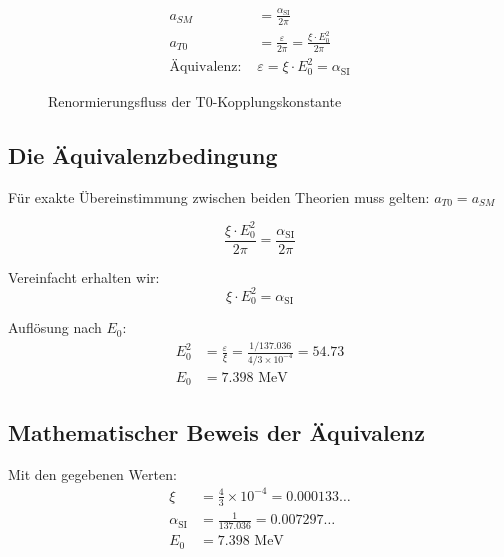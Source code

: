 \documentclass[12pt,a4paper]{article}
\numberwithin{equation}{section}
\newcommand{\xipar}{\xi}
\newcommand{\epsilonT}{\varepsilon}
\newcommand{\alphaSI}{\alpha_{\text{SI}}}
\newcommand{\Eo}{E_0}
\begin{document}
	\begin{align}
		a_{SM} &= \frac{\alphaSI}{2\pi} \\
		a_{T0} &= \frac{\epsilonT}{2\pi} = \frac{\xipar \cdot \Eo^2}{2\pi} \\
		\text{Äquivalenz: } &\epsilonT = \xipar \cdot \Eo^2 = \alphaSI
	\end{align}
	
	\begin{figure}[h]
		\centering
		\caption{Renormierungsfluss der T0-Kopplungskonstante}
		\label{fig:renormalization_flow}
	\end{figure}
	
	\subsection{Die Äquivalenzbedingung}
	
	Für exakte Übereinstimmung zwischen beiden Theorien muss gelten: $a_{T0} = a_{SM}$
	
	\begin{equation}
		\frac{\xipar \cdot \Eo^2}{2\pi} = \frac{\alphaSI}{2\pi}
		\label{eq:equivalence_condition}
	\end{equation}
	
	Vereinfacht erhalten wir:
	\begin{equation}
		\xipar \cdot \Eo^2 = \alphaSI
		\label{eq:simplified_equivalence}
	\end{equation}
	
	Auflösung nach $\Eo$:
	\begin{align}
		\Eo^2 &= \frac{ \epsilonT}{\xipar} = \frac{1/137.036}{4/3 \times 10^{-4}} = 54.73\\
		\Eo &= 7.398 \text{ MeV}
	\end{align}
	
	\subsection{Mathematischer Beweis der Äquivalenz}
	
	Mit den gegebenen Werten:
	\begin{align}
		\xipar &= \frac{4}{3} \times 10^{-4} = 0.000133\ldots\\
		\alphaSI &= \frac{1}{137.036} = 0.007297\ldots\\
		\Eo &= 7.398 \text{ MeV}
	\end{align}
	
\end{document}
